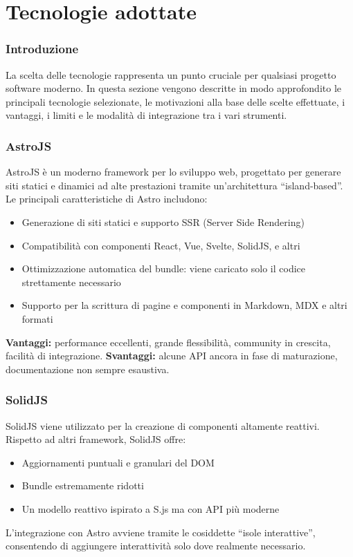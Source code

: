 \clearpage{\pagestyle{empty}\cleardoublepage}
\chapter{Tecnologie adottate}
\label{chap:tecnologie_adottate}
\subsection{Introduzione}
La scelta delle tecnologie rappresenta un punto cruciale per qualsiasi progetto software moderno. In questa sezione vengono descritte in modo approfondito le principali tecnologie selezionate, le motivazioni alla base delle scelte effettuate, i vantaggi, i limiti e le modalità di integrazione tra i vari strumenti.

\subsection{AstroJS}
AstroJS è un moderno framework per lo sviluppo web, progettato per generare siti statici e dinamici ad alte prestazioni tramite un’architettura “island-based”. Le principali caratteristiche di Astro includono:
\begin{itemize}
    \item Generazione di siti statici e supporto SSR (Server Side Rendering)
    \item Compatibilità con componenti React, Vue, Svelte, SolidJS, e altri
    \item Ottimizzazione automatica del bundle: viene caricato solo il codice strettamente necessario
    \item Supporto per la scrittura di pagine e componenti in Markdown, MDX e altri formati
\end{itemize}
\textbf{Vantaggi:} performance eccellenti, grande flessibilità, community in crescita, facilità di integrazione.
\textbf{Svantaggi:} alcune API ancora in fase di maturazione, documentazione non sempre esaustiva.

\subsection{SolidJS}
SolidJS viene utilizzato per la creazione di componenti altamente reattivi. Rispetto ad altri framework, SolidJS offre:
\begin{itemize}
    \item Aggiornamenti puntuali e granulari del DOM
    \item Bundle estremamente ridotti
    \item Un modello reattivo ispirato a S.js ma con API più moderne
\end{itemize}
L’integrazione con Astro avviene tramite le cosiddette “isole interattive”, consentendo di aggiungere interattività solo dove realmente necessario.

